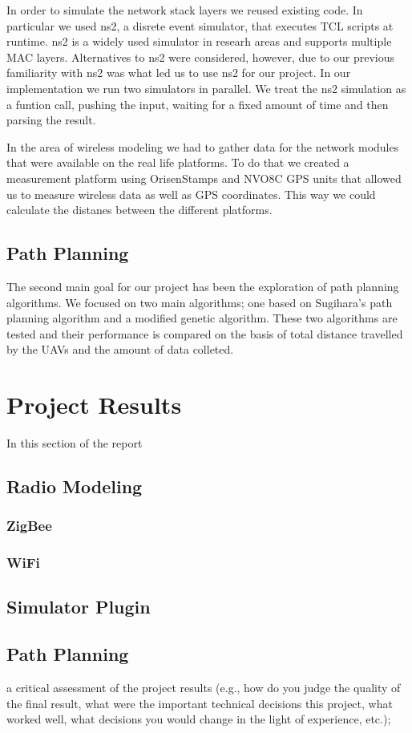 In order to simulate the network stack layers we reused existing code. In
particular we used ns2, a disrete event simulator, that executes TCL scripts at
runtime. ns2 is a widely used simulator in researh areas and supports multiple
MAC layers. Alternatives to ns2 were considered, however, due to our previous
familiarity with ns2 was what led us to use ns2 for our project. In our
implementation we run two simulators in parallel. We treat the ns2 simulation
as a funtion call, pushing the input, waiting for a fixed amount of time and
then parsing the result.

In the area of wireless modeling we had to gather data for the network modules
that were available on the real life platforms. To do that we created a
measurement platform using OrisenStamps and NVO8C GPS units that allowed us to
measure wireless data as well as GPS coordinates. This way we could calculate
the distanes between the different platforms.

\subsection{Path Planning}
The second main goal for our project has been the exploration of path planning
algorithms. We focused on two main algorithms; one based on Sugihara's path
planning algorithm and a modified genetic algorithm. These two algorithms are
tested and their performance is compared on the basis of total distance
travelled by the UAVs and the amount of data colleted.

\section{Project Results}
In this section of the report
\subsection{Radio Modeling}
\subsubsection{ZigBee}
\subsubsection{WiFi}
\subsection{Simulator Plugin}
\subsection{Path Planning}
a critical assessment of the project results (e.g., how do you judge the
quality of the final result, what were the important technical decisions
this project, what worked well, what decisions you would change in the light
of experience, etc.);

